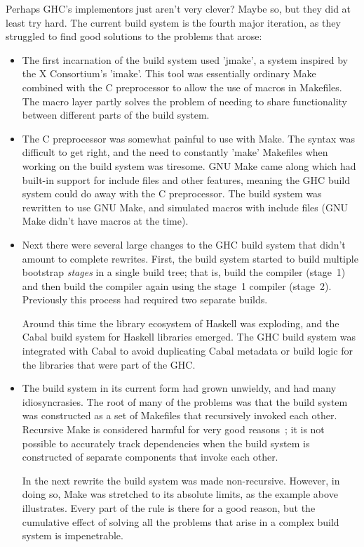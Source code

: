 Perhaps GHC's implementors just aren't very clever?  Maybe so, but
they did at least try hard. The current build system is the
fourth major iteration, as they struggled to find good solutions to the
problems that arose:

\begin{itemize}
\item The first incarnation of the build system used \lst'jmake', a
  system inspired by the X Consortium's \lst'imake'.  This tool was
  essentially ordinary Make combined with the C preprocessor to
  allow the use of macros in Makefiles.  The macro layer partly
  solves the problem of needing to share functionality between
  different parts of the build system.

\item The C preprocessor was somewhat painful to use with Make.
  The syntax was difficult to get right, and the need to constantly
  \lst'make' Makefiles when working on the build system was tiresome.  GNU
  Make came along which had built-in support for include files and
  other features, meaning the GHC build system could do away with the C
  preprocessor. The build system was rewritten to use GNU Make, and
  simulated macros with include files (GNU Make didn't have macros at
  the time).

\item Next there were several large changes to the GHC build system
  that didn't amount to complete rewrites.  First, the build system started
  to build multiple bootstrap \emph{stages} in a single build tree; that is,
  build the compiler (stage~1) and then build the compiler again using the
  stage~1 compiler (stage~2). Previously this process had required two separate builds.

  Around this time the library ecosystem of Haskell was exploding, and
  the Cabal build system for Haskell libraries emerged. The GHC build system was
  integrated with Cabal to avoid duplicating Cabal metadata or build logic for
  the libraries that were part of the GHC.

\item The build system in its current form had grown unwieldy, and had
  many idiosyncrasies. The root of many of the problems was that the
  build system was constructed as a set of Makefiles that recursively
  invoked each other. Recursive Make is considered harmful
  for very good reasons~\cite{miller:recursive_make}; it is not possible to
  accurately track dependencies when the build system is constructed
  of separate components that invoke each other.

  In the next rewrite the build system was made non-recursive.
  However, in doing so, Make was stretched to its absolute
  limits, as the example above illustrates. Every part of the rule is
  there for a good reason, but the cumulative effect of solving all
  the problems that arise in a complex build system is impenetrable.
\end{itemize}
